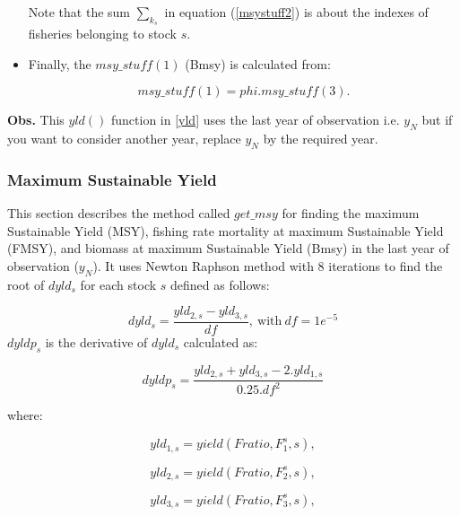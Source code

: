 \documentclass{article}
\begin{document}
\begin{itemize}
Note that the sum $\displaystyle\sum_{k_s}$ in equation (\ref{msystuff2}) is about the indexes of fisheries belonging to stock $s$.\\

\item Finally, the $msy\_stuff(1)$ (Bmsy) is calculated from:

\begin{equation}
    msy\_stuff(1)=phi.msy\_stuff(3).
\end{equation}
\end{itemize}

\textbf{Obs.} This $yld()$ function in \ref{yld}  uses the last year of observation i.e. $y_N$ but if you want to consider another year, replace $y_N$ by the required year.

\subsubsection{Maximum Sustainable Yield}

This section describes the method called $get\_msy$ for finding the maximum Sustainable Yield (MSY), fishing rate mortality at maximum Sustainable Yield (FMSY), and biomass at maximum Sustainable Yield (Bmsy) in the last year of observation ($y_N$). 
It uses Newton Raphson method with 8 iterations to find the root of $dyld_s$ for each stock $s$ defined as follows:

\begin{equation}
        dyld_s=\dfrac{yld_{2,s}-yld_{3,s}}{df}, \ \text{with} \  df=1e^{-5}
\end{equation}
$dyldp_s$ is the derivative of $dyld_s$ calculated as:

\begin{equation}
    dyldp_s=\dfrac{yld_{2,s}+yld_{3,s} - 2.yld_{1,s}}{0.25. df^2}
\end{equation}

where:

\begin{equation}
    yld_{1,s}=yield(Fratio,F_1^s,s),
\end{equation}

\begin{equation}
   yld_{2,s}=yield(Fratio,F_2^s,s),
\end{equation}

\begin{equation}
    yld_{3,s}=yield(Fratio, F_3^s,s),
\end{equation}
\end{document}
